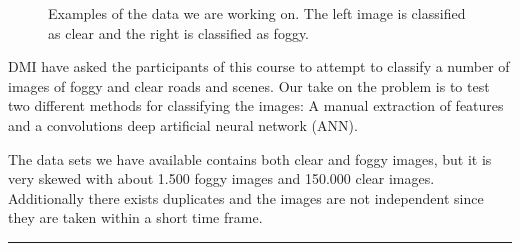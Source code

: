 \documentclass[
    ,title     = {{Methods for image classification}}
    ,longtitle
    ,highlight = dtured
    ,toplogo   = {{template/tex_dtu_compute_b_uk}}
    ,botlogo   = {{template/tex_dtu_frise}}
    ,papersize = {{a0paper}}
    ,colcount  = {{3columns}}
]{dtuposter}
\begin{document}
\begin{minipage}{\textwidth}
\begin{figure}
\begin{subfigure}[t]{0.15\textwidth}
\end{subfigure}
\caption{Examples of the data we are working on. The left image is classified as clear and the right is classified as foggy.}
\vspace{-1cm}
\end{figure}

DMI have asked the participants of this course to attempt to classify a number of images of foggy and clear roads and scenes. Our take on the problem is to test two different methods for classifying the images: A manual extraction of features and a convolutions deep artificial neural network (ANN).

The data sets we have available contains both clear and foggy images, but it is very skewed with about 1.500 foggy images and 150.000 clear images. Additionally there exists duplicates and the images are not independent since they are taken within a short time frame.








\vspace{1cm}
\hrule
\vspace{1cm}
\end{minipage}
\end{document}
